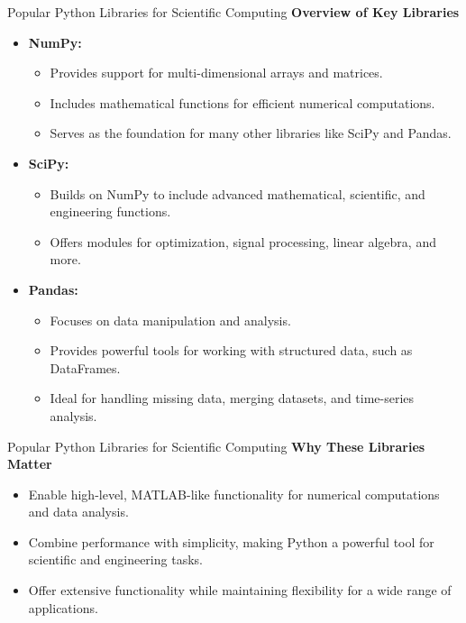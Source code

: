 \documentclass[10pt]{beamer}
\let\olditem\item
\renewcommand\item{\olditem\justifying}
\begin{document}
	\begin{frame}{Popular Python Libraries for Scientific Computing}
		\textbf{Overview of Key Libraries}
		\begin{itemize}
			\item \textbf{NumPy:}
			\begin{itemize}
				\item Provides support for multi-dimensional arrays and matrices.
				\item Includes mathematical functions for efficient numerical computations.
				\item Serves as the foundation for many other libraries like SciPy and Pandas.
			\end{itemize}
			\item \textbf{SciPy:}
			\begin{itemize}
				\item Builds on NumPy to include advanced mathematical, scientific, and engineering functions.
				\item Offers modules for optimization, signal processing, linear algebra, and more.
			\end{itemize}
			\item \textbf{Pandas:}
			\begin{itemize}
				\item Focuses on data manipulation and analysis.
				\item Provides powerful tools for working with structured data, such as DataFrames.
				\item Ideal for handling missing data, merging datasets, and time-series analysis.
			\end{itemize}
		\end{itemize}
		

	\end{frame}
	
	
	\begin{frame}{Popular Python Libraries for Scientific Computing}
			\textbf{Why These Libraries Matter}
	\begin{itemize}
		\item Enable high-level, MATLAB-like functionality for numerical computations and data analysis.
		\item Combine performance with simplicity, making Python a powerful tool for scientific and engineering tasks.
		\item Offer extensive functionality while maintaining flexibility for a wide range of applications.
	\end{itemize}
		\end{frame}
		
\end{document}
